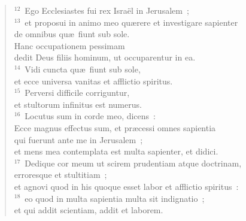 \begin{flushleft}\begin{verse}${}^{12}$~Ego Ecclesiastes fui rex Isra\"el in Jerusalem~;\\
${}^{13}$~et proposui in animo meo qu\ae rere et investigare sapienter\\ de omnibus qu\ae\ fiunt sub sole.\\ Hanc occupationem pessimam\\ dedit Deus filiis hominum, ut occuparentur in ea.\\
${}^{14}$~Vidi cuncta qu\ae\ fiunt sub sole,\\ et ecce universa vanitas et afflictio spiritus.\\
${}^{15}$~Perversi difficile corriguntur,\\ et stultorum infinitus est numerus.\\
${}^{16}$~Locutus sum in corde meo, dicens~:\\ Ecce magnus effectus sum, et pr\ae cessi omnes sapientia\\ qui fuerunt ante me in Jerusalem~;\\ et mens mea contemplata est multa sapienter, et didici.\\
${}^{17}$~Dedique cor meum ut scirem prudentiam atque doctrinam,\\ erroresque et stultitiam~;\\ et agnovi quod in his quoque esset labor et afflictio spiritus~:\\
${}^{18}$~eo quod in multa sapientia multa sit indignatio~;\\ et qui addit scientiam, addit et laborem.\end{verse}\end{flushleft}


